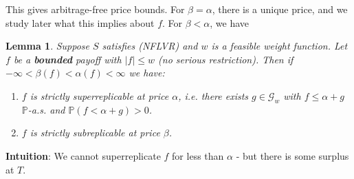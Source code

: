 \documentclass[12pt,a4paper, twoside]{article}
\newtheorem{lem}{Lemma}[section]
\theoremstyle{definition}
\newcommand{\PP}{\mathbb{P}} %
\begin{document}
This gives arbitrage-free price bounds. For $\beta= \alpha$, there is a unique price, and we study later what this implies about $f$. For $\beta < \alpha$, we have 
\begin{lem} \label{L93} Suppose $S$ satisfies (NFLVR) and $w$ is a feasible weight function. Let $f$ be a \textbf{bounded} payoff with $|f| \leq w$ (no serious restriction). Then if $- \infty < \beta(f) < \alpha(f) < \infty$ we have:
\begin{enumerate}
\item $f$ is strictly superreplicable at price $\alpha$, i.e. there exists $g \in \mathcal{G}_w$ with $f \leq \alpha + g$ $\PP$-a.s. and $\PP(f < \alpha + g) >0$. 
\item $f$ is strictly subreplicable at price $\beta$. 
\end{enumerate}
\end{lem}
\noindent \textbf{Intuition}: We cannot superreplicate $f$ for less than $\alpha$ - but there is some surplus at $T$.  
\end{document}
